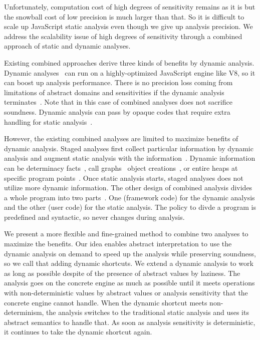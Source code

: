 Unfortunately, computation cost of high degrees of sensitivity remains as it is
but the snowball cost of low precision is much larger than that.
So it is difficult to scale up JavaScript static analysis even though we give up
analysis precision.
We address the scalability issue of high degrees of sensitivity through a
combined approach of static and dynamic analyses.


Existing combined approaches derive three kinds of benefits by dynamic analysis.
Dynamic analyses~\cite{jalangi, dlint} can run on a highly-optimized
JavaScript engine like V8, so it can boost up analysis performance.
There is no precision loss coming from limitations of abstract domains and
sensitivities if the dynamic analysis terminates~\cite{determinacy, concerto}.
Note that in this case of combined analyses does not sacrifice soundness.
Dynamic analysis can pass by opaque codes that require extra handling for static
analysis~\cite{battles, sra}.


However, the existing combined analyses are limited to maximize benefits of
dynamic analysis.
Staged analyses first collect particular information by dynamic analysis and
augment static analysis with the information~\cite{blendedJava, eha}.
Dynamic information can be determinacy facts~\cite{determinacy}, call graphs~\cite{tunable}
object creations~\cite{blendedJS}, or entire heaps at specific program points~\cite{battles}.
Once static analysis starts, staged analyses does not utilize more dynamic information.
The other design of combined analysis divides a whole program into two parts~\cite{concerto}.
One (framework code) for the dynamic analysis  and the other (user code) for the
static analysis.
The policy to divde a program is predefined and syntactic, so never changes
during analysis.


We present a more flexible and fine-grained method to combine two analyses to
maximize the benefits.
Our idea enables abstract interpretation to use the dynamic analysis on demand
to speed up the analysis while preserving soundness, so we call that adding
dynamic shortcuts.
We extend a dynamic analysis to work as long as possible despite of the presence
of abstract values by laziness.
The analysis goes on the concrete engine as much as possible until it meets
operations with non-deterministic values by abstract values or analysis
sensitivity that the concrete engine cannot handle.
When the dynamic shortcut meets non-determinism, the analysis switches to
the traditional static analysis and uses its abstract semantics to handle that.
As soon as analysis sensitivity is deterministic, it continues to take the
dynamic shortcut again.

